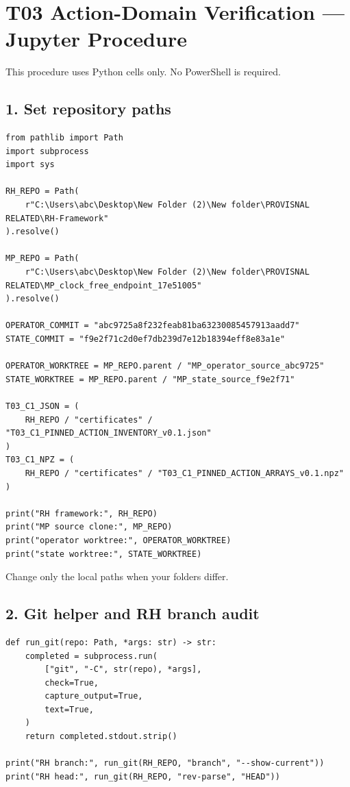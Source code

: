\hypertarget{t03-action-domain-verification-jupyter-procedure}{%
\chapter{T03 Action-Domain Verification --- Jupyter Procedure}\label{t03-action-domain-verification-jupyter-procedure}}

This procedure uses Python cells only. No PowerShell is required.

\hypertarget{set-repository-paths}{%
\section{1. Set repository paths}\label{set-repository-paths}}

\begin{verbatim}
from pathlib import Path
import subprocess
import sys

RH_REPO = Path(
    r"C:\Users\abc\Desktop\New Folder (2)\New folder\PROVISNAL RELATED\RH-Framework"
).resolve()

MP_REPO = Path(
    r"C:\Users\abc\Desktop\New Folder (2)\New folder\PROVISNAL RELATED\MP_clock_free_endpoint_17e51005"
).resolve()

OPERATOR_COMMIT = "abc9725a8f232feab81ba63230085457913aadd7"
STATE_COMMIT = "f9e2f71c2d0ef7db239d7e12b18394eff8e83a1e"

OPERATOR_WORKTREE = MP_REPO.parent / "MP_operator_source_abc9725"
STATE_WORKTREE = MP_REPO.parent / "MP_state_source_f9e2f71"

T03_C1_JSON = (
    RH_REPO / "certificates" / "T03_C1_PINNED_ACTION_INVENTORY_v0.1.json"
)
T03_C1_NPZ = (
    RH_REPO / "certificates" / "T03_C1_PINNED_ACTION_ARRAYS_v0.1.npz"
)

print("RH framework:", RH_REPO)
print("MP source clone:", MP_REPO)
print("operator worktree:", OPERATOR_WORKTREE)
print("state worktree:", STATE_WORKTREE)
\end{verbatim}

Change only the local paths when your folders differ.

\hypertarget{git-helper-and-rh-branch-audit}{%
\section{2. Git helper and RH branch audit}\label{git-helper-and-rh-branch-audit}}

\begin{verbatim}
def run_git(repo: Path, *args: str) -> str:
    completed = subprocess.run(
        ["git", "-C", str(repo), *args],
        check=True,
        capture_output=True,
        text=True,
    )
    return completed.stdout.strip()

print("RH branch:", run_git(RH_REPO, "branch", "--show-current"))
print("RH head:", run_git(RH_REPO, "rev-parse", "HEAD"))
\end{verbatim}

